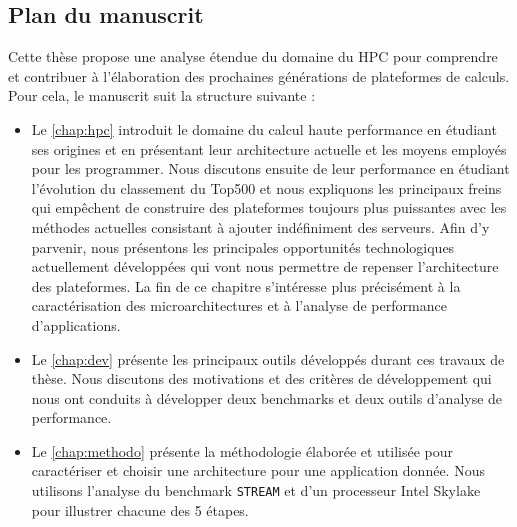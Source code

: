                 
    \subsection{Plan du manuscrit}
    
        Cette thèse propose une analyse étendue du domaine du \gls{HPC} pour comprendre et contribuer à l'élaboration des prochaines générations de plateformes de calculs. Pour cela, le manuscrit suit la structure suivante :
        
        \begin{itemize}
            \item Le \autoref{chap:hpc} introduit le domaine du calcul haute performance en étudiant ses origines et en présentant leur architecture actuelle et les moyens employés pour les programmer. Nous discutons ensuite de leur performance en étudiant l'évolution du classement du Top500 et nous expliquons les principaux freins qui empêchent de construire des plateformes toujours plus puissantes avec les méthodes actuelles consistant à ajouter indéfiniment des serveurs. Afin d'y parvenir, nous présentons les principales opportunités technologiques actuellement développées qui vont nous permettre de repenser l'architecture des plateformes. La fin de ce chapitre s'intéresse plus précisément à la caractérisation des microarchitectures et à l'analyse de performance d'applications.
        
            \item Le \autoref{chap:dev} présente les principaux outils développés durant ces travaux de thèse. Nous discutons des motivations et des critères de développement qui nous ont conduits à développer deux benchmarks et deux outils d'analyse de performance.
        
            \item Le \autoref{chap:methodo} présente la méthodologie élaborée et utilisée pour caractériser et choisir une architecture pour une application donnée. Nous utilisons l'analyse du benchmark \verb|STREAM| et d'un processeur Intel Skylake pour illustrer chacune des 5 étapes.
        \end{itemize}
            
